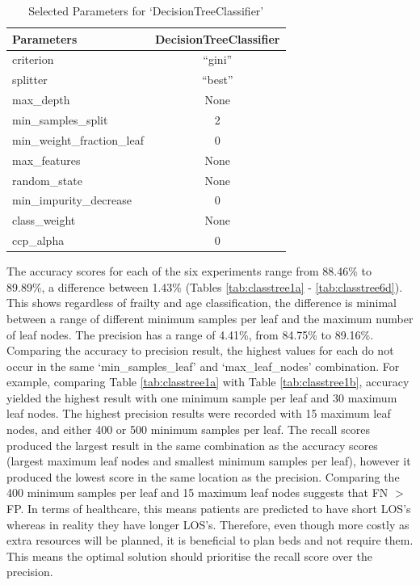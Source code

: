 \documentclass[../thesis.tex]{subfiles}
\begin{document}
\begin{table}[h!]
    \centering
    \begin{tabular}{lc}\toprule
      \textbf{Parameters}   & \textbf{DecisionTreeClassifier} \\\midrule
       criterion  & ``gini'' \\
       splitter & ``best'' \\
       max\_depth & None \\
       min\_samples\_split & 2 \\
       min\_weight\_fraction\_leaf & 0\\
       max\_features & None \\
       random\_state & None \\
       min\_impurity\_decrease & 0\\
       class\_weight & None \\
       ccp\_alpha &0\\ \bottomrule
    \end{tabular}
    \caption{Selected Parameters for `DecisionTreeClassifier'}
    \label{tab:paramforclass}
\end{table}

The accuracy scores for each of the six experiments range from 88.46\% to 89.89\%, a difference between 1.43\% (Tables \ref{tab:classtree1a} - \ref{tab:classtree6d}). This shows regardless of frailty and age classification, the difference is minimal between a range of different minimum samples per leaf and the maximum number of leaf nodes. The precision has a range of 4.41\%, from 84.75\% to 89.16\%. Comparing the accuracy to precision result, the highest values for each do not occur in the same `min\_samples\_leaf' and `max\_leaf\_nodes' combination. For example, comparing Table \ref{tab:classtree1a} with Table \ref{tab:classtree1b}, accuracy yielded the highest result with one minimum sample per leaf and 30 maximum leaf nodes. The highest precision results were recorded with 15 maximum leaf nodes, and either 400 or 500 minimum samples per leaf. The recall scores produced the largest result in the same combination as the accuracy scores (largest maximum leaf nodes and smallest minimum samples per leaf), however it produced the lowest score in the same location as the precision. Comparing the 400 minimum samples per leaf and 15 maximum leaf nodes suggests that FN $>$ FP. In terms of healthcare, this means patients are predicted to have short LOS's whereas in reality they have longer LOS's. Therefore, even though more costly as extra resources will be planned, it is beneficial to plan beds and not require them. This means the optimal solution should prioritise the recall score over the precision.
\end{document}
